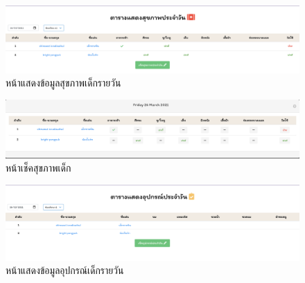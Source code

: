   \begin{figure}
    \begin{center}
    \includegraphics[width=\linewidth]{images/Health.png}
    \end{center}
    \caption[หน้าแสดงข้อมูลสุขภาพเด็กรายวัน]{หน้าแสดงข้อมูลสุขภาพเด็กรายวัน}
    \label{fig:Health}
    \end{figure}

  \begin{figure}
    \begin{center}
    \includegraphics[width=\linewidth]{images/checkHealth.png}
    \end{center}
    \caption[หน้าเช็คสุขภาพเด็ก]{หน้าเช็คสุขภาพเด็ก}
    \label{fig:CheckHealth}
    \end{figure}

    \begin{figure}
      \begin{center}
      \includegraphics[width=\linewidth]{images/Gadget.png}
      \end{center}
      \caption[หน้าแสดงข้อมูลอุปกรณ์เด็กรายวัน]{หน้าแสดงข้อมูลอุปกรณ์เด็กรายวัน}
      \label{fig:Gadget}
      \end{figure}
  
